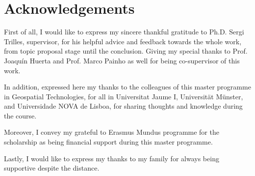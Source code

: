 \chapter*{Acknowledgements} \label{Acknowledgements}

\npara First of all, I would like to express my sincere thankful gratitude to Ph.D. Sergi Trilles, supervisor, for his helpful advice and feedback towards the whole work, from topic proposal stage until the conclusion.
Giving my special thanks to Prof. Joaquín Huerta and Prof. Marco Painho as well for being co-supervisor of this work.

\npara In addition, expressed here my thanks to the colleagues of this master programme in Geospatial Technologies, for all in Universitat Jaume I, Universität Münster, and Universidade NOVA de Lisboa, for sharing thoughts and knowledge during the course.

\npara Moreover, I convey my grateful to Erasmus Mundus programme for the scholarship as being financial support during this master programme.

\npara Lastly, I would like to express my thanks to my family for always being supportive despite the distance.
